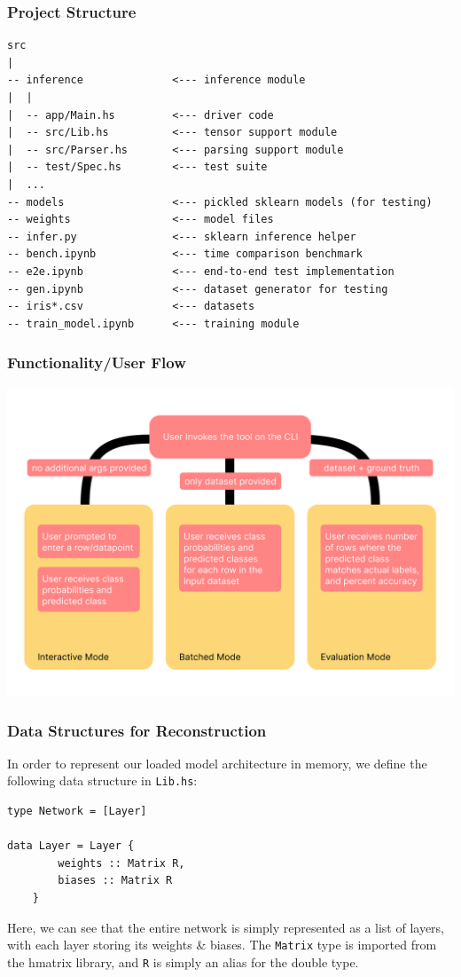 \documentclass[12pt, titlepage]{article}
\begin{document}
\subsubsection{Project Structure}
\begin{verbatim}
src
|
-- inference              <--- inference module
|  |
|  -- app/Main.hs         <--- driver code
|  -- src/Lib.hs          <--- tensor support module
|  -- src/Parser.hs       <--- parsing support module
|  -- test/Spec.hs        <--- test suite
|  ...
-- models                 <--- pickled sklearn models (for testing)
-- weights                <--- model files
-- infer.py               <--- sklearn inference helper
-- bench.ipynb            <--- time comparison benchmark
-- e2e.ipynb              <--- end-to-end test implementation
-- gen.ipynb              <--- dataset generator for testing
-- iris*.csv              <--- datasets
-- train_model.ipynb      <--- training module
\end{verbatim}

\subsubsection{Functionality/User Flow}
\begin{center}
	\includegraphics[width = \textwidth]{../images/UserFlow.png}
\end{center}

\subsubsection{Data Structures for Reconstruction}
In order to represent our loaded model architecture in memory, we define the following data structure in \verb|Lib.hs|:
\begin{lstlisting}
type Network = [Layer]

data Layer = Layer {
		weights :: Matrix R,
		biases :: Matrix R
	}
\end{lstlisting}
Here, we can see that the entire network is simply represented as a list of layers, with each layer storing its weights \& biases. The \verb|Matrix| type is imported from the hmatrix library, and \verb|R| is simply an alias for the double type.
\end{document}
